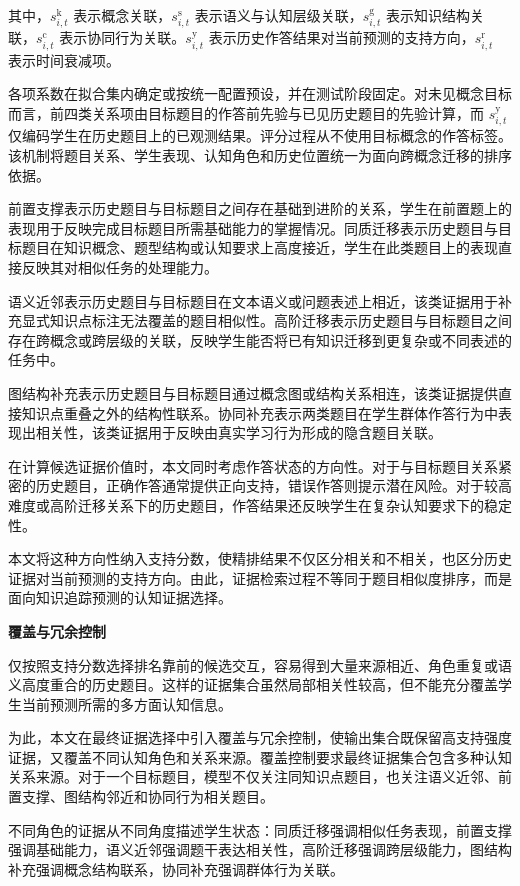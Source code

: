 \documentclass[UTF8,a4paper,12pt]{ctexart}
\numberwithin{table}{section}
\begin{document}
其中，\(s^{\mathrm{k}}_{i,t}\) 表示概念关联，\(s^{\mathrm{s}}_{i,t}\) 表示语义与认知层级关联，\(s^{\mathrm{g}}_{i,t}\) 表示知识结构关联，\(s^{\mathrm{c}}_{i,t}\) 表示协同行为关联。\(s^{\mathrm{y}}_{i,t}\) 表示历史作答结果对当前预测的支持方向，\(s^{\mathrm{r}}_{i,t}\) 表示时间衰减项。

各项系数在拟合集内确定或按统一配置预设，并在测试阶段固定。对未见概念目标而言，前四类关系项由目标题目的作答前先验与已见历史题目的先验计算，而 \(s^{\mathrm{y}}_{i,t}\) 仅编码学生在历史题目上的已观测结果。评分过程从不使用目标概念的作答标签。该机制将题目关系、学生表现、认知角色和历史位置统一为面向跨概念迁移的排序依据。

前置支撑表示历史题目与目标题目之间存在基础到进阶的关系，学生在前置题上的表现用于反映完成目标题目所需基础能力的掌握情况。同质迁移表示历史题目与目标题目在知识概念、题型结构或认知要求上高度接近，学生在此类题目上的表现直接反映其对相似任务的处理能力。

语义近邻表示历史题目与目标题目在文本语义或问题表述上相近，该类证据用于补充显式知识点标注无法覆盖的题目相似性。高阶迁移表示历史题目与目标题目之间存在跨概念或跨层级的关联，反映学生能否将已有知识迁移到更复杂或不同表述的任务中。

图结构补充表示历史题目与目标题目通过概念图或结构关系相连，该类证据提供直接知识点重叠之外的结构性联系。协同补充表示两类题目在学生群体作答行为中表现出相关性，该类证据用于反映由真实学习行为形成的隐含题目关联。

在计算候选证据价值时，本文同时考虑作答状态的方向性。对于与目标题目关系紧密的历史题目，正确作答通常提供正向支持，错误作答则提示潜在风险。对于较高难度或高阶迁移关系下的历史题目，作答结果还反映学生在复杂认知要求下的稳定性。

本文将这种方向性纳入支持分数，使精排结果不仅区分相关和不相关，也区分历史证据对当前预测的支持方向。由此，证据检索过程不等同于题目相似度排序，而是面向知识追踪预测的认知证据选择。

\noindent\textbf{覆盖与冗余控制}

仅按照支持分数选择排名靠前的候选交互，容易得到大量来源相近、角色重复或语义高度重合的历史题目。这样的证据集合虽然局部相关性较高，但不能充分覆盖学生当前预测所需的多方面认知信息。

为此，本文在最终证据选择中引入覆盖与冗余控制，使输出集合既保留高支持强度证据，又覆盖不同认知角色和关系来源。覆盖控制要求最终证据集合包含多种认知关系来源。对于一个目标题目，模型不仅关注同知识点题目，也关注语义近邻、前置支撑、图结构邻近和协同行为相关题目。

不同角色的证据从不同角度描述学生状态：同质迁移强调相似任务表现，前置支撑强调基础能力，语义近邻强调题干表达相关性，高阶迁移强调跨层级能力，图结构补充强调概念结构联系，协同补充强调群体行为关联。
\end{document}
